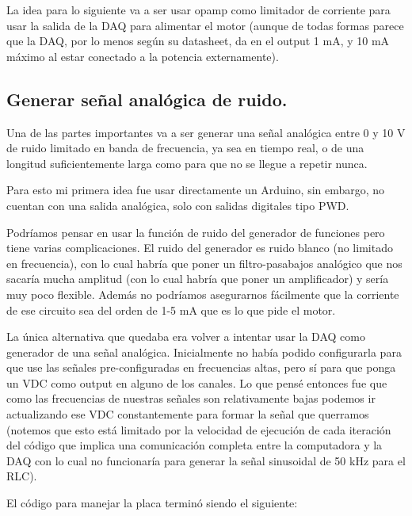La idea para lo siguiente va a ser usar opamp como limitador de corriente para usar la salida de la DAQ para alimentar el motor (aunque de todas formas parece que la DAQ, por lo menos según su datasheet, da en el output 1 mA, y 10 mA máximo al estar conectado a la potencia externamente). 
 
\subsection*{Generar señal analógica de ruido.} 
Una de las partes importantes va a ser generar una señal analógica entre 0 y 10 V de ruido limitado en banda de frecuencia, ya sea en tiempo real, o de una longitud suficientemente larga como para que no se llegue a repetir nunca.

Para esto mi primera idea fue usar directamente un Arduino, sin embargo, no cuentan con una salida analógica, solo con salidas digitales tipo PWD. 


Podríamos pensar en usar la función de ruido del generador de funciones pero tiene varias complicaciones. El ruido del generador es ruido blanco (no limitado en frecuencia), con lo cual habría que poner un filtro-pasabajos analógico que nos sacaría mucha amplitud (con lo cual habría que poner un amplificador) y sería muy poco flexible. Además no podríamos asegurarnos fácilmente que la corriente de ese circuito sea del orden de 1-5 mA que es lo que pide el motor. 

La única alternativa que quedaba era volver a intentar usar la DAQ como generador de una señal analógica. Inicialmente no había podido configurarla para que use las señales pre-configuradas en frecuencias altas, pero sí para que ponga un VDC como output en alguno de los canales. Lo que pensé entonces fue que como las frecuencias de nuestras señales son relativamente bajas podemos ir actualizando ese VDC constantemente para formar la señal que querramos (notemos que esto está limitado por la velocidad de ejecución de cada iteración del código que implica una comunicación completa entre la computadora y la DAQ con lo cual no funcionaría para generar la señal sinusoidal de 50 kHz para el RLC). 

El código para manejar la placa terminó siendo el siguiente: 


